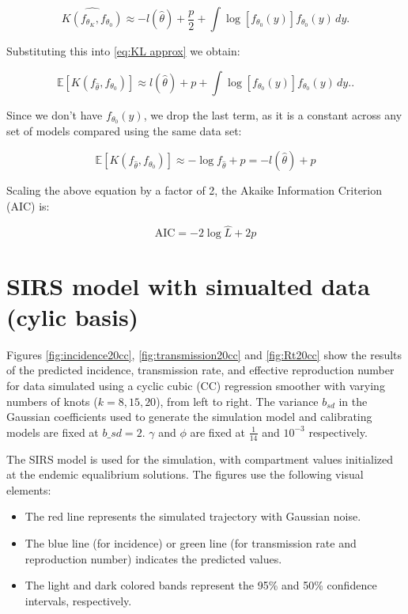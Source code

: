 \documentclass[
11pt, %
oneside, %
english, %
singlespacing, %
]{macthesis} %
\def\tightlist{}
\begin{document}
\[ 
\widehat{K(f_{\theta_K}, f_{\theta_0})}
 \approx -l(\hat{\theta}) + \frac{p}{2} + \int \log[f_{\theta_0}(y)] f_{\theta_0}(y) \, dy. 
\]

Substituting this into \ref{eq:KL approx} we obtain:

\[
\mathbb{E}[K(f_{\hat{\theta}}, f_{\theta_0})] \approx  l({\hat{\theta}}) + p+ \int \log[f_{\theta_0}(y)] f_{\theta_0}(y) \, dy. .
\]

Since we don't have \(f_{\theta_0}(y)\), we drop the last term, as it is a constant across any set of models compared using the same data set:

\[
\mathbb{E}[K(f_{\hat{\theta}}, f_{\theta_0})] \approx -\log f_{\hat{\theta}} + p = -l(\hat{\theta}) + p
\]

Scaling the above equation by a factor of 2, the Akaike Information Criterion (AIC) is:

\begin{equation}
\text{AIC} = -2 \log \hat{L} + 2p
\label{eq:AIC}
\end{equation}

\chapter{SIRS model with simualted data (cylic basis)}\label{Appendix-results}

Figures \ref{fig:incidence20cc}, \ref{fig:transmission20cc} and \ref{fig:Rt20cc} show the results of the predicted incidence, transmission rate, and effective reproduction number for data simulated using a cyclic cubic (CC) regression smoother with varying numbers of knots (\(k = 8, 15, 20\)), from left to right. The variance \(b_{sd}\) in the Gaussian coefficients used to generate the simulation model and calibrating models are fixed at \(b\_sd = 2\). \(\gamma\) and \(\phi\) are fixed at \(\frac{1}{14}\) and \(10^{-3}\) respectively.

The SIRS model is used for the simulation, with compartment values initialized at the endemic equalibrium solutions. The figures use the following visual elements:

\begin{itemize}
\tightlist
\item
  The red line represents the simulated trajectory with Gaussian noise.
\item
  The blue line (for incidence) or green line (for transmission rate and reproduction number) indicates the predicted values.
\item
  The light and dark colored bands represent the 95\% and 50\% confidence intervals, respectively.
\end{itemize}
\end{document}

